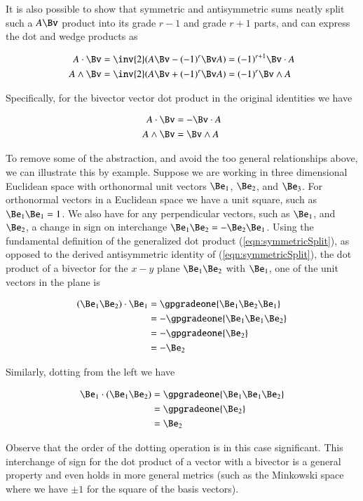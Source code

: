 It is also possible to show that symmetric and antisymmetric sums neatly split such a $A \Bv$ product into its grade $r-1$ and grade $r+1$ parts, and can express the dot and wedge products as

\begin{align}\label{eqn:symmetricSplit}
A \cdot \Bv &= \inv{2} (A \Bv -(-1)^r \Bv A) = (-1)^{r+1} \Bv \cdot A \\
A \wedge \Bv &= \inv{2} (A \Bv +(-1)^r \Bv A) = (-1)^r \Bv \wedge A
\end{align}

Specifically, for the bivector vector dot product in the original identities we have 

\begin{align}\label{eqn:bivectorProductSign}
A \cdot \Bv &= - \Bv \cdot A \\
A \wedge \Bv &= \Bv \wedge A
\end{align}

To remove some of the abstraction, and avoid the too general relationships above, we can illustrate this by example.  Suppose we are working in three dimensional Euclidean space with orthonormal unit vectors $\Be_1$, $\Be_2$, and $\Be_3$.  For orthonormal vectors in a Euclidean space we have a unit square, such as $\Be_1 \Be_1 = 1$.  We also have for any perpendicular vectors, such as $\Be_1$, and $\Be_2$, a change in sign on interchange $\Be_1 \Be_2 = -\Be_2 \Be_1$.  Using the fundamental definition of the generalized dot product (\ref{eqn:symmetricSplit}), as opposed to the derived antisymmetric identity of (\ref{eqn:symmetricSplit}), the dot product of a bivector for the $x-y$ plane $\Be_1 \Be_2$ with $\Be_1$, one of the unit vectors in the plane is

\begin{align*}
(\Be_1 \Be_2) \cdot \Be_1
&=
\gpgradeone{ \Be_1 \Be_2 \Be_1 } \\
&=
-\gpgradeone{ \Be_1 \Be_1 \Be_2 } \\
&=
-\gpgradeone{ \Be_2 } \\
&=
-\Be_2
\end{align*}

Similarly, dotting from the left we have

\begin{align*}
\Be_1 \cdot (\Be_1 \Be_2) 
&=
\gpgradeone{ \Be_1 \Be_1 \Be_2 } \\
&=
\gpgradeone{ \Be_2 } \\
&=
\Be_2
\end{align*}

Observe that the order of the dotting operation is in this case significant.  This interchange of sign for the dot product of a vector with a bivector is a general property and even holds in more general metrics (such as the Minkowski space where we have $\pm 1$ for the square of the basis vectors).

\EndNoBibArticle
